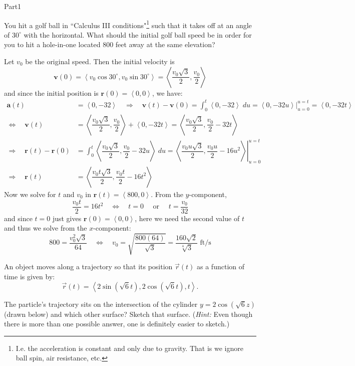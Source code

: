 \documentclass{report}
\newcommand{\avec}[1]{\left\langle #1 \right\rangle}
\newcommand{\vect}[1]{\overrightarrow{#1}}
\begin{document}
\begin{exam}{Part1}
\begin{problem}[7] You hit a golf ball in ``Calculus III conditions"\footnote{I.e. the acceleration is constant and only due to gravity. That is we ignore ball spin, air resistance, etc.} such that it takes off at an angle of $30^\circ$ with the horizontal. What should the initial golf ball speed be in order for you to hit a hole-in-one located 800 feet away at the same elevation?
\begin{solution}[2in] Let $v_0$ be the original speed. Then the initial velocity is $$\mathbf{v}(0)=\avec{v_0\cos30^{\circ},v_0\sin30^{\circ}}=\avec{\dfrac{v_0\sqrt{3}}{2},\dfrac{v_0}{2}}$$ and since the initial position is $\mathbf{r}(0)=\avec{0,0}$, we have:
\begin{align*}
\mathbf{a}(t)&=\avec{0,-32} \quad\Longrightarrow\quad \mathbf{v}(t)-\mathbf{v}(0)=\int_0^t\avec{0,-32}\;du=\avec{0,-32u}\Big|_{u=0}^{u=t}=\avec{0,-32t}\\
\Longleftrightarrow\quad \mathbf{v}(t) &=\avec{\dfrac{v_0\sqrt{3}}{2},\dfrac{v_0}{2}}+\avec{0,-32t}=\avec{\dfrac{v_0\sqrt{3}}{2},\dfrac{v_0}{2}-32t}\\
\Longrightarrow\quad \mathbf{r}(t)-\mathbf{r}(0) &= \int_0^t \avec{\dfrac{v_0\sqrt{3}}{2},\dfrac{v_0}{2}-32u}\;du=\left. \avec{\dfrac{v_0u\sqrt{3}}{2},\dfrac{v_0u}{2}-16u^2}\right|_{u=0}^{u=t}\\
\Longrightarrow\quad \mathbf{r}(t) &=  \avec{\dfrac{v_0t\sqrt{3}}{2},\dfrac{v_0t}{2}-16t^2}
\end{align*}
Now we solve for $t$ and $v_0$ in $\mathbf{r}(t)=\avec{800,0}$. From the $y$-component,
$$\frac{v_0t}{2}=16t^2 \quad\Longleftrightarrow\quad t=0\quad \text{ or }\quad t=\frac{v_0}{32} $$
and since $t=0$ just gives $\mathbf{r}(0)=\avec{0,0}$, here we need the second value of $t$ and thus we solve from the $x$-component:
$$800=\frac{v_0^2\sqrt{3}}{64} \quad\Longleftrightarrow\quad v_0=\sqrt{\frac{800(64)}{\sqrt{3}}}=\boxed{\frac{160\sqrt{2}}{\sqrt[4]{3}}\text{ ft/s}}$$
\end{solution} 
	\end{problem}



\begin{problem*}[\auto] An object moves along a trajectory so that its position $\vect{r}(t)$ as a function of time is given by:
$$\vect{r}(t)=\avec{2\sin(\sqrt{6}t),2\cos(\sqrt{6}t),t}. $$
\begin{parts}
\item{} The particle's trajectory sits on the intersection of the cylinder $y=2\cos(\sqrt{6}z)$ (drawn below) and which other surface? Sketch that surface.
(\emph{Hint:} Even though there is more than one possible answer, one is definitely easier to sketch.)
\begin{solution}[3in]


\end{solution}
\end{parts}
\end{problem*}
\end{exam}
\end{document}
